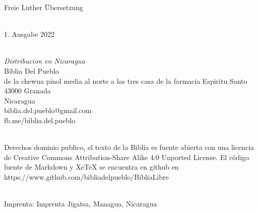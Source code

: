 Freie Luther Übersetzung\\
\strut \\
1. Ausgabe 2022\\
\strut \\
\emph{Distribucion en Nicaragua}\\
Biblia Del Pueblo\\
de la chewua pinol media al norte a las tres casa de la farmacia
Espiritu Santo\\
43000 Granada\\
Nicaragua\\
biblia.del.pueblo@gmail.com\\
fb.me/biblia.del.pueblo\\
\strut \\
Derechos dominio publico, el texto de la Biblia es fuente abierta con
una licencia de Creative Commons Attribution-Share Alike 4:0 Unported
License. El código fuente de Markdown y XeTeX se encuentra en github
en\\
https://www.github.com/bibliadelpueblo/BibliaLibre\\
\strut \\
Imprenta: Imprenta Jigatsa, Managua, Nicaragua\\
